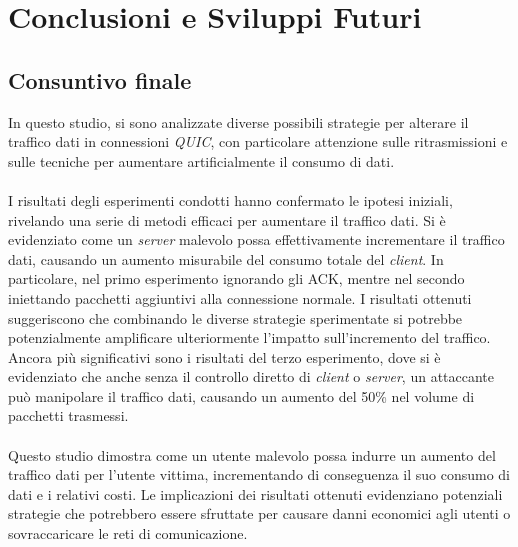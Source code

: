 \chapter{Conclusioni e Sviluppi Futuri}
\label{cap:conclusioni}

\section{Consuntivo finale}
In questo studio, si sono analizzate diverse possibili strategie per alterare il traffico dati in connessioni \emph{QUIC},
con particolare attenzione sulle ritrasmissioni e sulle tecniche per aumentare artificialmente il consumo di dati.
\\\\
I risultati degli esperimenti condotti hanno confermato le ipotesi iniziali, rivelando una serie di metodi efficaci per aumentare il traffico dati. 
Si è evidenziato come un \emph{server} malevolo possa effettivamente incrementare il traffico dati, causando un aumento misurabile del consumo totale del \emph{client}.
In particolare, nel primo esperimento ignorando gli ACK, mentre nel secondo iniettando pacchetti aggiuntivi alla connessione normale. 
I risultati ottenuti suggeriscono che combinando le diverse strategie sperimentate si
potrebbe potenzialmente amplificare ulteriormente l'impatto sull'incremento del traffico. 
Ancora più significativi sono i risultati del terzo esperimento, dove si è evidenziato che anche senza il controllo diretto di \emph{client} o \emph{server}, 
un attaccante può manipolare il traffico dati, causando un aumento del 50\% nel volume di pacchetti trasmessi.
\\\\
Questo studio dimostra come un utente malevolo possa indurre un aumento del traffico dati per l'utente vittima, incrementando di conseguenza il suo consumo di dati e i relativi costi.
Le implicazioni dei risultati ottenuti evidenziano potenziali strategie che potrebbero essere sfruttate per causare danni economici agli utenti o sovraccaricare le reti di comunicazione.
